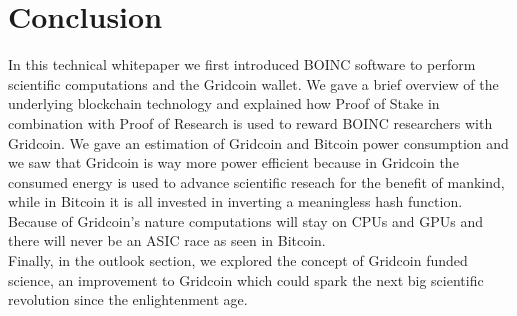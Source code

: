 \section{Conclusion}

In this technical whitepaper we first introduced BOINC software to perform scientific computations and the Gridcoin wallet. We gave a brief overview of the underlying blockchain technology and explained how Proof of Stake in combination with Proof of Research is used to reward BOINC researchers with Gridcoin. We gave an estimation of Gridcoin and Bitcoin power consumption and we saw that Gridcoin is way more power efficient because in Gridcoin the consumed energy is used to advance scientific reseach for the benefit of mankind, while in Bitcoin it is all invested in inverting a meaningless hash function. Because of Gridcoin's nature computations will stay on CPUs and GPUs and there will never be an ASIC race as seen in Bitcoin.\\

Finally, in the outlook section, we explored the concept of Gridcoin funded science, an improvement to Gridcoin which could spark the next big scientific revolution since the enlightenment age.\\


